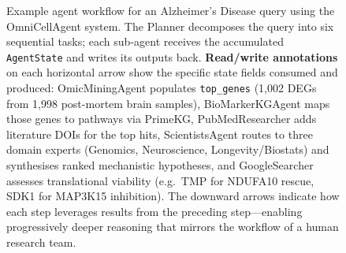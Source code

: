 \begin{figure}[p]
{%
}%
\caption{Example agent workflow for an Alzheimer's Disease query using the
OmniCellAgent system.  The Planner decomposes the query into six sequential
tasks; each sub-agent receives the accumulated \texttt{AgentState} and writes
its outputs back.
\textbf{Read/write annotations} on each horizontal arrow show the specific
state fields consumed and produced: OmicMiningAgent populates
\texttt{top\_genes} (1{,}002 DEGs from 1{,}998 post-mortem brain samples),
BioMarkerKGAgent maps those genes to pathways via PrimeKG,
PubMedResearcher adds literature DOIs for the top hits, ScientistsAgent
routes to three domain experts (Genomics, Neuroscience, Longevity/Biostats)
and synthesises ranked mechanistic hypotheses, and GoogleSearcher assesses
translational viability (e.g.\ TMP for NDUFA10 rescue, SDK1 for MAP3K15
inhibition).  The downward arrows indicate how each step leverages results
from the preceding step---enabling progressively deeper reasoning that
mirrors the workflow of a human research team.}
\label{fig:workflow-example}
\end{figure}
